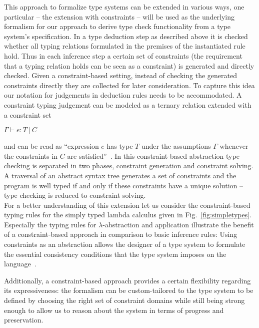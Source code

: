 This approach to formalize type systems can be extended in various
ways, one particular -- the extension with constraints -- will be used
as the underlying formalism for our approach to derive type check
functionality from a type system's specification.  In a type
deduction step as described above it is checked whether all typing
relations formulated in the premises of the instantiated rule
hold. Thus in each inference step a certain set of constraints (the
requirement that a typing relation holds can be seen as a constraint)
is generated and directly checked.  Given a constraint-based setting,
instead of checking the generated constraints directly they are
collected for later consideration. To capture this idea our notation
for judgements in deduction rules needs to be accommodated.
A constraint typing judgement can be modeled as a ternary relation
extended with a constraint set
\begin{center}
  $\Gamma \vdash e : T\ |\ C$
\end{center}
and can be read as ``expression $e$ has type $T$ under the assumptions
$\Gamma$ whenever the constraints in $C$ are
satisfied''~\cite{Tapl}. In this constraint-based abstraction type
checking is separated in two phases, constraint generation and
constraint solving. A traversal of an abstract syntax tree
generates a set of constraints and the program is well typed if and
only if these constraints have a unique solution -- type checking is
reduced to constraint solving.\\
For a better understanding of this extension let us consider the
constraint-based typing rules for the simply typed lambda calculus
given in Fig.~\ref{fig:simpletypes}. Especially the typing rules for
$\lambda$-abstraction and application illustrate the benefit of a
constraint-based approach in comparison to basic inference rules:
Using constraints as an abstraction allows the designer of a type
system to formulate the essential consistency conditions that the type
system imposes on the language~\cite{Gast04}.

Additionally, a constraint-based approach provides a certain
flexibility regarding its expressiveness: the formalism can be
custom-tailored to the type system to be defined by choosing the right
set of constraint domains while still being strong enough to allow us
to reason about the system in terms of progress and preservation.



